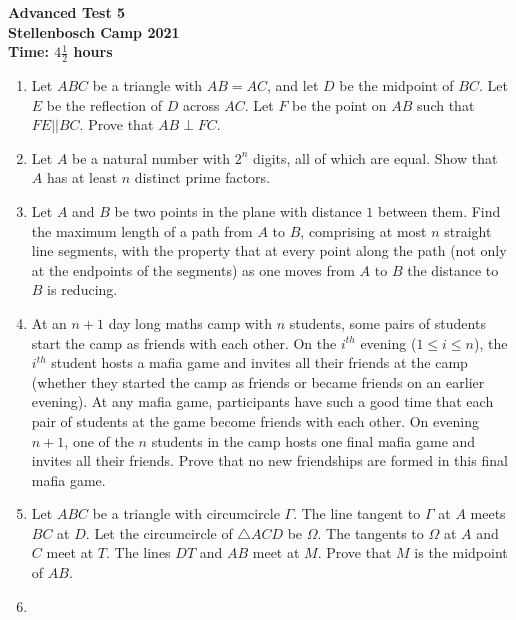 \documentclass{article}
\begin{document}
\thispagestyle{empty}

\begin{center}
  \textbf{\Large Advanced Test 5}
  \\ \vspace{1em}
  \textbf{\large Stellenbosch Camp 2021}
  \\ \vspace{1em}
  \textbf{\large Time: $4\frac{1}{2}$ hours}
\end{center}

\bigskip

\begin{enumerate}[itemsep=\fill]

\item %
Let $ABC$ be a triangle with $AB=AC$, and let $D$ be the midpoint of $BC$. Let $E$ be the reflection of $D$ across $AC$. Let $F$ be the point on $AB$ such that $FE||BC$. Prove that $AB\perp FC$.


\item %
Let $A$ be a natural number with $2^n$ digits, all of which are equal. Show that $A$ has at least $n$ distinct prime factors.


\item %
Let $A$ and $B$ be two points in the plane with distance $1$ between them.
Find the maximum length of a path from $A$ to $B$, comprising at most $n$ straight line segments, with the property that at every point along the path (not only at the endpoints of the segments) as one moves from $A$ to $B$ the distance to $B$ is reducing.


\item %
At an $n+1$ day long maths camp with $n$ students, some pairs of students start the camp as friends with each other. On the $i^{th}$ evening ($1 \leq i \leq n$), the $i^{th}$ student hosts a mafia game and invites all their friends at the camp (whether they started the camp as friends or became friends on an earlier evening). At any mafia game, participants have such a good time that each pair of students at the game become friends with each other. On evening $n+1$, one of the $n$ students in the camp hosts one final mafia game and invites all their friends. Prove that no new friendships are formed in this final mafia game.


\item %
Let $ABC$ be a triangle with circumcircle $\Gamma$. The line tangent to $\Gamma$ at $A$ meets $BC$ at $D$. Let the circumcircle of $\triangle ACD$ be $\Omega$. The tangents to $\Omega$ at $A$ and $C$ meet at $T$. The lines $DT$ and $AB$ meet at $M$. Prove that $M$ is the midpoint of $AB$.


\item %

\end{enumerate}
\end{document}
